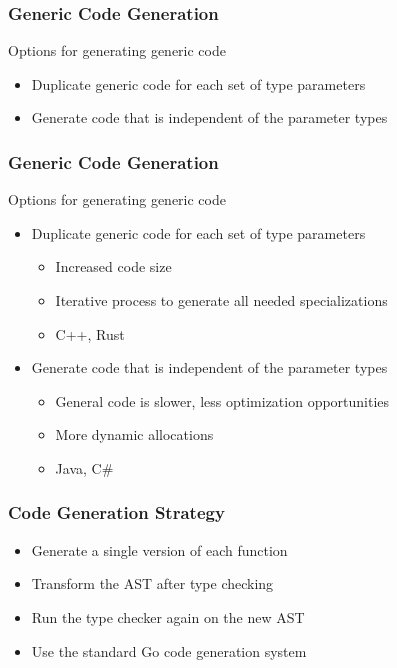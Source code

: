 \documentclass[12pt]{beamer}
\begin{document}

\begin{frame}[fragile]
\frametitle{Generic Code Generation}
Options for generating generic code
\begin{itemize}
\item Duplicate generic code for each set of type parameters
\item Generate code that is independent of the parameter types
\end{itemize}
\end{frame}


\begin{frame}[fragile]
\frametitle{Generic Code Generation}
Options for generating generic code
\begin{itemize}
\item Duplicate generic code for each set of type parameters
  \begin{itemize}
  \item Increased code size
  \item Iterative process to generate all needed specializations
  \item C++, Rust
  \end{itemize}
\item Generate code that is independent of the parameter types
  \begin{itemize}
  \item General code is slower, less optimization opportunities
  \item More dynamic allocations
  \item Java, C\#
  \end{itemize}
\end{itemize}
\end{frame}


\begin{frame}[fragile]
\frametitle{Code Generation Strategy}
\begin{itemize}
\item Generate a single version of each function
\item Transform the AST after type checking
\item Run the type checker again on the new AST
\item Use the standard Go code generation system
\end{itemize}
\end{frame}
\end{document}
